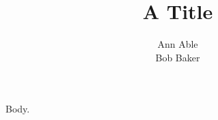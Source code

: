 \documentclass{article}
\begin{document}
\title{A Title}
\author{\begin{tabular}{c}Ann Able\\ Bob Baker\end{tabular}}
\maketitle
Body.
\end{document}
